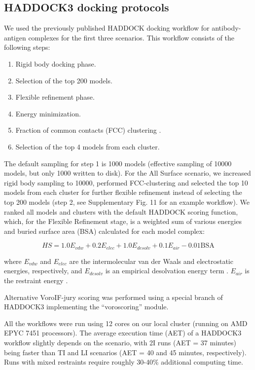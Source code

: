 \documentclass[12pt]{article}
\begin{document}
\subsection{HADDOCK3 docking protocols}

We used the previously published HADDOCK docking workflow for antibody-antigen complexes \cite{ambrosetti2020modeling} for the first three scenarios. This workflow consists of the following steps:
\begin{enumerate}
    \item Rigid body docking phase.
    \item Selection of the top 200 models.
    \item Flexible refinement phase.
    \item Energy minimization.
    \item Fraction of common contacts (FCC) clustering \cite{rodrigues2012clustering}.   
    \item Selection of the top 4 models from each cluster.
\end{enumerate}

The default sampling for step 1 is 1000 models (effective sampling of 10000 models, but only 1000 written to disk). For the All Surface scenario, we increased rigid body sampling to 10000, performed FCC-clustering and selected the top 10 models from each cluster for further flexible refinement instead of selecting the top 200 models (step 2, see Supplementary Fig. 11 for an example workflow). We ranked all models and clusters with the default HADDOCK scoring function, which, for the Flexible Refinement stage, is a weighted sum of various energies and buried surface area (BSA) calculated for each model complex: 

\begin{equation}
	HS = 1.0 E_{vdw} + 0.2 E_{elec} + 1.0 E_{desolv} + 0.1 E_{air} - 0.01  \text{BSA}
\end{equation}

where $E_{vdw}$ and $E_{elec}$ are the intermolecular van der Waals and electrostatic energies, respectively, and $E_{desolv}$ is an empirical desolvation energy term \cite{fernandez2004identification}. $E_{air}$ is the restraint energy \cite{dominguez2003haddock}.

Alternative VoroIF-jury scoring \cite{olechnovivc2023voroif, olechnovivc2023prediction} was performed using a special branch of HADDOCK3 implementing the “voroscoring” module.

All the workflows were run using 12 cores on our local cluster (running on AMD EPYC 7451 processors). The average execution time (AET) of a HADDOCK3 workflow slightly depends on the scenario, with 2I runs (AET = 37 minutes) being faster than TI and LI scenarios (AET = 40 and 45 minutes, respectively). Runs with mixed restraints require roughly 30-40\% additional computing time.
\end{document}
